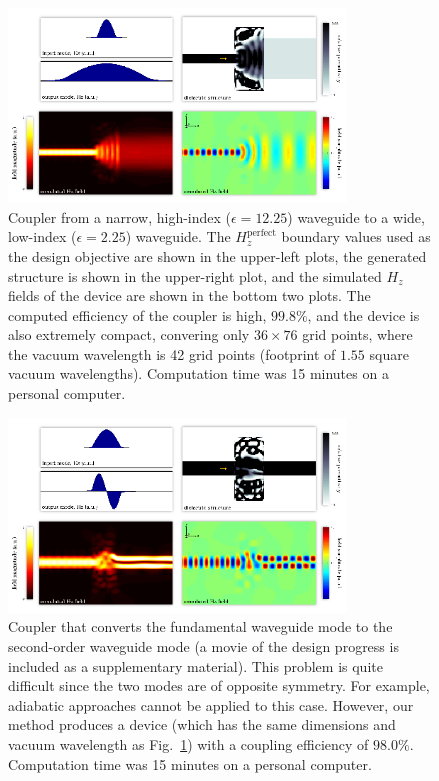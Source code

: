 \documentclass[letterpaper,10pt]{article}
\begin{document}
\begin{figure}[htb]
    \centering
    \includegraphics[width=0.8\textwidth]{1} 
    \caption{Coupler from a narrow, high-index ($\epsilon=12.25$) waveguide to
            a wide, low-index ($\epsilon=2.25$) waveguide. 
        The $H_z^\text{perfect}$ boundary values used as 
            the design objective are shown in the upper-left plots, 
            the generated structure is shown in the upper-right plot, and
            the simulated $H_z$ fields of the device are shown 
            in the bottom two plots.
        The computed efficiency of the coupler is high, $99.8\%$, and
            the device is also extremely compact, 
            convering only $36 \times 76$ grid points,
            where the vacuum wavelength is 42 grid points
            (footprint of $1.55$ square vacuum wavelengths).
        Computation time was 15 minutes on a personal computer.}
    \label{fig:fiber}
\end{figure}
\begin{figure}[htb]
    \centering
    \includegraphics[width=0.8\textwidth]{2} 
    \caption{Coupler that converts the fundamental waveguide mode to the
            second-order waveguide mode
            (a movie of the design progress is included as a
            supplementary material).
        This problem is quite difficult since the two modes are of 
            opposite symmetry.
        For example, adiabatic approaches cannot be applied to this case.
        However, our method produces a device 
            (which has the same dimensions and vacuum wavelength as 
            Fig.~\ref{fig:fiber})  
            with a coupling efficiency of $98.0\%$. 
        Computation time was 15 minutes on a personal computer.
        }
    \label{fig:mode}
\end{figure}
\end{document}
